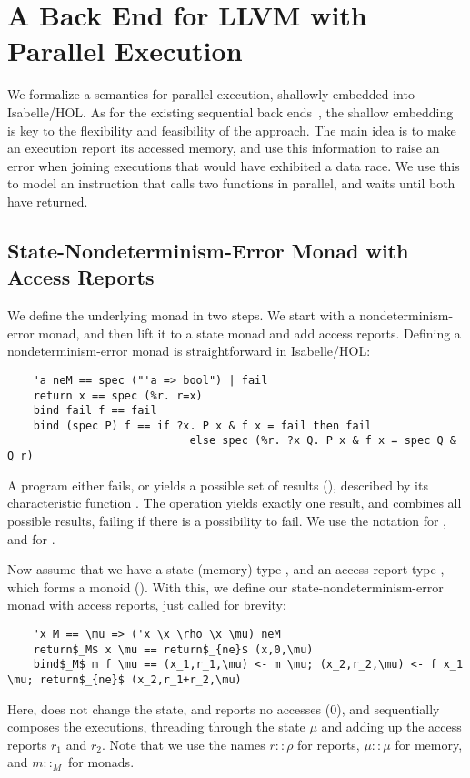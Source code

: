 \documentclass[sn-mathphys,Numbered]{sn-jnl}
\theoremstyle{thmstyleone}%
\theoremstyle{definition}%
\theoremstyle{thmstylethree}%
\begin{document}
\section{A Back End for LLVM with Parallel Execution}\label{sec:parsem}
  We formalize a semantics for parallel execution, shallowly embedded into Isabelle/HOL.
  As for the existing sequential back ends~\cite{La15,La19-llvm}, the shallow embedding is key
  to the flexibility and feasibility of the approach.
  The main idea is to make an execution report its accessed memory,
  and use this information to raise an error when joining executions that
  would have exhibited a data race. We use this to model an instruction that
  calls two functions in parallel, and waits until both have returned.

  \subsection{State-Nondeterminism-Error Monad with Access Reports}\label{sec:monad}
  We define the underlying monad in two steps. We start with a nondeterminism-error monad,
  and then lift it to a state monad and add access reports.
  Defining a nondeterminism-error monad is straightforward in Isabelle/HOL:
  \begin{lstlisting}
    'a neM == spec ("'a => bool") | fail
    return x == spec (%r. r=x)
    bind fail f == fail
    bind (spec P) f == if ?x. P x & f x = fail then fail
                            else spec (%r. ?x Q. P x & f x = spec Q & Q r)
  \end{lstlisting}
  A program either fails, or yields a possible set of results (), described by its characteristic function .
  The  operation yields exactly one result, and  combines all possible results,
  failing if there is a possibility to fail. We use the notation  for ,
  and  for .

  Now assume that we have a state (memory) type \is{\mu}, and an access report type \is{\rho}, which forms a monoid ().
  With this, we define our state-nondeterminism-error monad with access reports, just called  for brevity:
  \begin{lstlisting}
    'x M == \mu => ('x \x \rho \x \mu) neM
    return$_M$ x \mu == return$_{ne}$ (x,0,\mu)
    bind$_M$ m f \mu == (x_1,r_1,\mu) <- m \mu; (x_2,r_2,\mu) <- f x_1 \mu; return$_{ne}$ (x_2,r_1+r_2,\mu)
  \end{lstlisting}
  Here,  does not change the state, and reports no accesses (\is$0$),
  and  sequentially composes the executions, threading through the state $\mu$ and adding up the access reports \is$r_1$ and \is$r_2$. Note that we use the names \is$r :: \rho$ for reports, \is$\mu :: \mu$ for memory, and \is$m :: _ M$ for monads.
\end{document}
